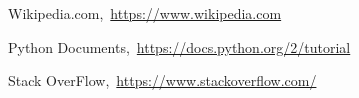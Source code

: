 \cleardoublepage
{}
{}
\begin{thebibliography}{99}

Wikipedia.com,\ \url{https://www.wikipedia.com}

Python Documents,\ \url{https://docs.python.org/2/tutorial}

Stack OverFlow,\ \url{https://www.stackoverflow.com/}
\end{thebibliography}
